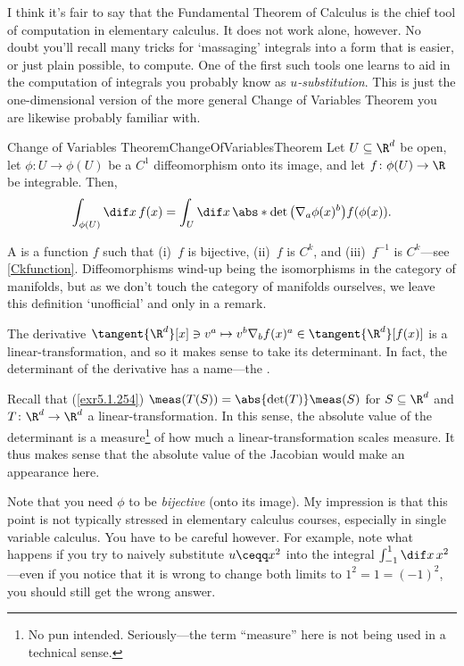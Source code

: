 I think it's fair to say that the Fundamental Theorem of Calculus is the chief tool of computation in elementary calculus.  It does not work alone, however.  No doubt you'll recall many tricks for `massaging' integrals into a form that is easier, or just plain possible, to compute.  One of the first such tools one learns to aid in the computation of integrals you probably know as \emph{$u$-substitution}.  This is just the one-dimensional version of the more general Change of Variables Theorem you are likewise probably familiar with.
\begin{thm}{Change of Variables Theorem}{ChangeOfVariablesTheorem}
Let $U\subseteq \R ^d$ be open, let $\phi \colon U\rightarrow \phi (U)$ be a $C^1$ diffeomorphism onto its image, and let $f\colon \phi (U)\rightarrow \R$ be integrable.  Then,
\begin{equation}
\int _{\phi (U)}\dif x\, f(x)=\int _U\dif x\, \abs*{\det \left( \nabla _a\phi (x)^b\right) }f(\phi (x)).
\end{equation}
\begin{rmk}
A  is a function $f$ such that (i)~$f$ is bijective, (ii)~$f$ is $C^k$, and (iii)~$f^{-1}$ is $C^k$---see \cref{Ckfunction}.  Diffeomorphisms wind-up being the isomorphisms in the category of manifolds, but as we don't touch the category of manifolds ourselves, we leave this definition `unofficial' and only in a remark.
\end{rmk}
\begin{rmk}
The derivative $\tangent{\R ^d}[x]\ni v^a\mapsto v^b\nabla _bf(x)^a\in \tangent{\R ^d}[f(x)]$ is a linear-transformation, and so it makes sense to take its determinant.  In fact, the determinant of the derivative has a name---the .
\end{rmk}
\begin{rmk}
Recall that (\cref{exr5.1.254}) $\meas (T(S))=\abs{\det (T)}\meas (S)$ for $S\subseteq \R ^d$ and $T\colon \R ^d\rightarrow \R ^d$ a linear-transformation.  In this sense, the absolute value of the determinant is a measure\footnote{No pun intended.  Seriously---the term ``measure'' here is not being used in a technical sense.} of how much a linear-transformation scales measure.  It thus makes sense that the absolute value of the Jacobian would make an appearance here.
\end{rmk}
\begin{rmk}
Note that you need $\phi$ to be \emph{bijective} (onto its image).  My impression is that this point is not typically stressed in elementary calculus courses, especially in single variable calculus.  You have to be careful however.  For example, note what happens if you try to naively substitute $u\ceqq x^2$ into the integral $\int _{-1}^1\dif x\, x^2$---even if you notice that it is wrong to change both limits to $1^2=1=(-1)^2$, you should still get the wrong answer.

\end{rmk}
\end{thm}
